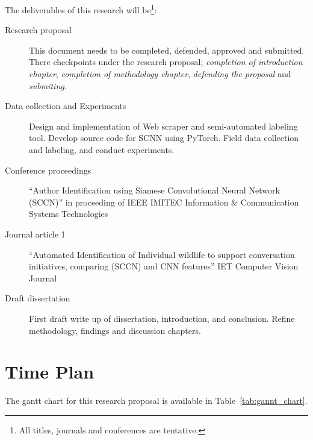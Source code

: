 The deliverables of this research will be\footnote{All titles, journals and conferences are tentative.}:
\begin{description}
\item[Research proposal] This document needs to be completed, defended, approved and submitted. There checkpoints under the research proposal; \textit{completion of introduction chapter}, \textit{completion of methodology chapter}, \textit{defending the proposal} and \textit{submiting}. 
\item[Data collection and Experiments] Design and implementation of Web scraper and semi-automated labeling tool. Develop source code for SCNN using PyTorch. 
Field data collection and labeling, and conduct experiments.  
\item[Conference proceedings] ``Author Identification using Siamese Convolutional Neural Network (SCCN)'' in proceeding of IEEE IMITEC Information \& Communication Systems \/ Technologies 

\item[Journal article 1] ``Automated Identification of Individual wildlife to support conversation initiatives, comparing (SCCN) and CNN features'' IET Computer Vision Journal

\item[Draft dissertation] First draft write up of dissertation, introduction, and conclusion. Refine methodology, findings and discussion chapters.

\end{description}

\section{Time Plan} \label{timePlan}
The gantt chart for this research proposal is available in
Table~\ref{tab:gannt_chart}.


